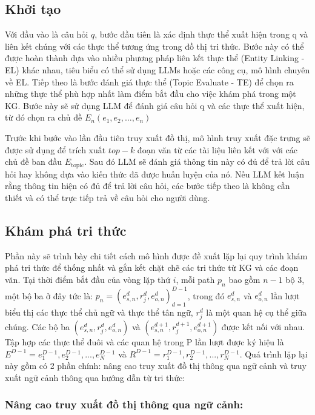 \subsection{Khởi tạo}
\label{subsection:initialization}
Với đầu vào là câu hỏi $q$, bước đầu tiên là xác định thực thể xuất hiện trong q và liên kết chúng với các thực thể tương ứng trong đồ thị tri thức. Bước này có thể được hoàn thành dựa vào nhiều phương pháp liên kết thực thể (Entity Linking - EL) khác nhau, tiêu biểu có thể sử dụng LLMs hoặc các công cụ, mô hình chuyên về EL. Tiếp theo là bước đánh giá thực thể (Topic Evaluate - TE) để chọn ra những thực thể phù hợp nhất làm điểm bắt đầu cho việc khám phá trong một KG. Bước này sẽ sử dụng LLM để đánh giá câu hỏi q và các thực thể xuất hiện, từ đó chọn ra chủ đề $E_n (e_1, e_2, \dots, e_n)$

Trước khi bước vào lần đầu tiên truy xuất đồ thị, mô hình truy xuất đặc trưng sẽ được sử dụng để trích xuất $top-k$ đoạn văn từ các tài liệu liên kết với với các chủ đề ban đầu $E_{\text{topic}}$. Sau đó LLM sẽ đánh giá thông tin này có đủ để trả lời câu hỏi hay không dựa vào kiến thức đã được huấn luyện của nó. Nếu LLM kết luận rằng thông tin hiện có đủ để trả lời câu hỏi, các bước tiếp theo là không cần thiết và có thể trực tiếp trả về câu hỏi cho người dùng.

\subsection{Khám phá tri thức}
\label{subsection:knowledge_exploration}
Phần này sẽ trình bày chi tiết cách mô hình được đề xuất lặp lại quy trình khám phá tri thức để thống nhất và gắn kết chặt chẽ các tri thức từ KG và các đoạn văn. Tại thời điểm bắt đầu của vòng lặp thứ $i$, mỗi path $p_n$ bao gồm $n - 1$ bộ 3, một bộ ba ở đây tức là: $p_n = {(e_{s,n}^d, r_j^d, e_{o,n}^d)}_{d=1}^{D-1}$, trong đó $e_{s,n}^d$ và $e_{o,n}^d$ lần lượt biểu thị các thực thể chủ ngữ và thực thể tân ngữ, $r_j^d$ là một quan hệ cụ thể giữa chúng. Các bộ ba $(e_{s,n}^d, r_j^d, e_{o,n}^d)$ và $(e_{s,n}^{d+1}, r_j^{d+1}, e_{o,n}^{d+1})$ được kết nối với nhau. Tập hợp các thực thể đuôi và các quan hệ trong P lần lượt được ký hiệu là $E^{D-1} = {e_1^{D-1}, e_2^{D-1}, ..., e_N^{D-1}}$ và $R^{D-1} = {r_1^{D-1}, r_2^{D-1}, ..., r_N^{D-1}}$. Quá trình lặp lại này gồm có 2 phần chính: nâng cao truy xuất đồ thị thông qua ngữ cảnh và truy xuất ngữ cảnh thông qua hướng dẫn từ tri thức:

\subsubsection{Nâng cao truy xuất đồ thị thông qua ngữ cảnh:}

